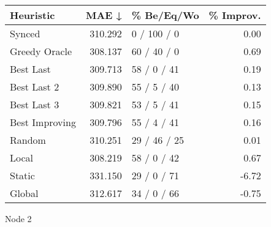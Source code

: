 \begin{tabular}{lrlr}
\toprule
\textbf{Heuristic} & \textbf{MAE ↓} & \textbf{\% Be/Eq/Wo} & \textbf{\% Improv.} \\
\midrule
            Synced &        310.292 &          0 / 100 / 0 &                0.00 \\
     Greedy Oracle &        308.137 &          60 / 40 / 0 &                0.69 \\
         Best Last &        309.713 &          58 / 0 / 41 &                0.19 \\
       Best Last 2 &        309.890 &          55 / 5 / 40 &                0.13 \\
       Best Last 3 &        309.821 &          53 / 5 / 41 &                0.15 \\
    Best Improving &        309.796 &          55 / 4 / 41 &                0.16 \\
            Random &        310.251 &         29 / 46 / 25 &                0.01 \\
             Local &        308.219 &          58 / 0 / 42 &                0.67 \\
            Static &        331.150 &          29 / 0 / 71 &               -6.72 \\
            Global &        312.617 &          34 / 0 / 66 &               -0.75 \\
\bottomrule
\end{tabular}
\caption{Node 2}
\label{tab:non_lr01_le2_bs2_2}
